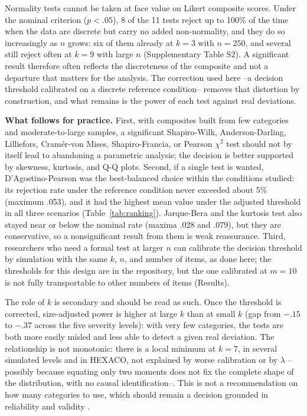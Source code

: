 \documentclass[man,mask,donotrepeattitle,floatsintext]{apa7}
\begin{document}
Normality tests cannot be taken at face value on Likert composite scores. Under the nominal criterion ($p<.05$), 8 of the 11 tests reject up to 100\% of the time when the data are discrete but carry no added non-normality, and they do so increasingly as $n$ grows: six of them already at $k=3$ with $n=250$, and several still reject often at $k=9$ with large $n$ (Supplementary Table S2). A significant result therefore often reflects the discreteness of the composite and not a departure that matters for the analysis. The correction used here --a decision threshold calibrated on a discrete reference condition-- removes that distortion by construction, and what remains is the power of each test against real deviations.

\textbf{What follows for practice.} First, with composites built from few categories and moderate-to-large samples, a significant Shapiro-Wilk, Anderson-Darling, Lilliefors, Cramér-von Mises, Shapiro-Francia, or Pearson $\chi^2$ test should not by itself lead to abandoning a parametric analysis; the decision is better supported by skewness, kurtosis, and Q-Q plots. Second, if a single test is wanted, D'Agostino-Pearson was the best-balanced choice within the conditions studied: its rejection rate under the reference condition never exceeded about 5\% (maximum .053), and it had the highest mean value under the adjusted threshold in all three scenarios (Table~\ref{tab:ranking}). Jarque-Bera and the kurtosis test also stayed near or below the nominal rate (maxima .028 and .079), but they are conservative, so a nonsignificant result from them is weak reassurance. Third, researchers who need a formal test at larger $n$ can calibrate the decision threshold by simulation with the same $k$, $n$, and number of items, as done here; the thresholds for this design are in the repository, but the one calibrated at $m=10$ is not fully transportable to other numbers of items (Results).

The role of $k$ is secondary and should be read as such. Once the threshold is corrected, size-adjusted power is higher at large $k$ than at small $k$ (gap from $-.15$ to $-.37$ across the five severity levels): with very few categories, the tests are both more easily misled and less able to detect a given real deviation. The relationship is not monotonic: there is a local minimum at $k=7$, in several simulated levels and in HEXACO, not explained by worse calibration or by $\lambda$ --possibly because equating only two moments does not fix the complete shape of the distribution, with no causal identification--. This is not a recommendation on how many categories to use, which should remain a decision grounded in reliability and validity \parencite{lozano2008,preston2000}.
\end{document}
